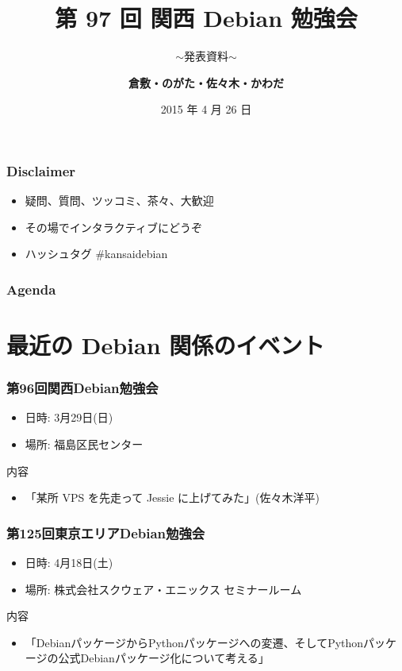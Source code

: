 \documentclass[cjk,dvipdfmx,10pt,compress,%
hyperref={bookmarks=true,bookmarksnumbered=true,bookmarksopen=false,%
colorlinks=false,%
pdftitle={第 97 回 関西 Debian 勉強会},%
pdfauthor={倉敷・のがた・佐々木・かわだ},%
pdfsubject={資料},%
}]{beamer}
\title{第 97 回 関西 Debian 勉強会}
\subtitle{$\sim$発表資料$\sim$}
\author[かわだ てつたろう]{{\large\bf 倉敷・のがた・佐々木・かわだ}}
\institute[Debian JP]{{\normalsize\tt 関西 Debian 勉強会}}
\date{{\small 2015 年 4 月 26 日}}
\begin{document}
\settitleslide
\begin{frame}
\titlepage
\end{frame}
\setdefaultslide

\begin{frame}[fragile]
  \frametitle{Disclaimer}
  \begin{itemize}
  \item 疑問、質問、ツッコミ、茶々、\alert{大歓迎}
  \item その場でインタラクティブにどうぞ
  \item ハッシュタグ \#kansaidebian
  \end{itemize}
\end{frame}

\begin{frame}[fragile]
\frametitle{Agenda}

\tableofcontents

\end{frame}

\section{最近の Debian 関係のイベント}


\begin{frame}[fragile]
  \frametitle{第96回関西Debian勉強会}
  \begin{itemize}
  \item 日時: 3月29日(日)
  \item 場所: 福島区民センター
  \end{itemize}
  \begin{block}{内容}
    \begin{itemize}
    \item「某所 VPS を先走って Jessie に上げてみた」(佐々木洋平)
    \end{itemize}
  \end{block}
\end{frame}

\begin{frame}[fragile]
  \frametitle{第125回東京エリアDebian勉強会}
  \begin{itemize}
  \item 日時: 4月18日(土)
  \item 場所: 株式会社スクウェア・エニックス セミナールーム
  \end{itemize}
  \begin{block}{内容}
    \begin{itemize}
    \item 「DebianパッケージからPythonパッケージへの変遷、そしてPythonパッケージの公式Debianパッケージ化について考える」
    \end{itemize}
  \end{block}
\end{frame}
\end{document}

